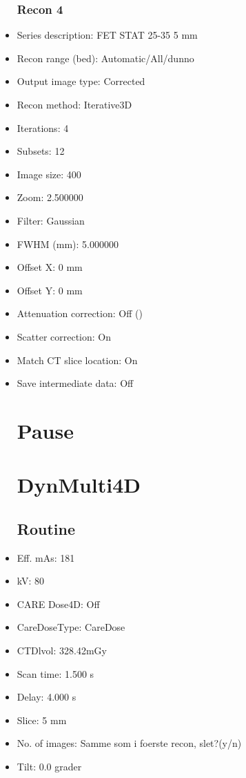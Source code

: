 \documentclass[12pt]{article}
\begin{document}
\begin{itemize}
\subsubsection{Recon 4}
\item Series description: FET STAT 25-35 5 mm
\item Recon range (bed): Automatic/All/dunno
\item Output image type: Corrected
\item Recon method: Iterative3D
\item Iterations: 4
\item Subsets: 12
\item Image size: 400
\item Zoom: 2.500000
\item Filter: Gaussian
\item FWHM (mm): 5.000000
\item Offset X: 0 mm
\item Offset Y: 0 mm
\item Attenuation correction: Off ()
\item Scatter correction: On
\item Match CT slice location: On
\item Save intermediate data: Off
\section{Pause}

\section{DynMulti4D}
\subsection{Routine}
\item Eff. mAs: 181\item kV: 80\item CARE Dose4D: Off\item CareDoseType: CareDose\item CTDlvol: 328.42mGy\item Scan time: 1.500 s\item Delay: 4.000 s\item Slice: 5 mm\item No. of images: Samme som i foerste recon, slet?(y/n)\item Tilt: 0.0 grader

\end{itemize}
\end{document}
